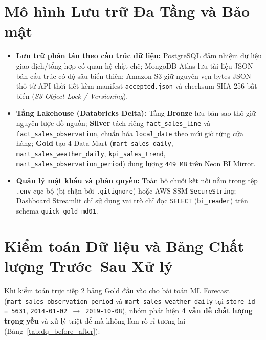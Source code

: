 \section{Mô hình Lưu trữ Đa Tầng và Bảo mật}
\begin{itemize}[leftmargin=1.5em]
  \item \textbf{Lưu trữ phân tán theo cấu trúc dữ liệu:} PostgreSQL đảm nhiệm dữ liệu giao dịch/tổng hợp có quan hệ chặt chẽ; MongoDB Atlas lưu tài liệu JSON bán cấu trúc có độ sâu biến thiên; Amazon S3 giữ nguyên vẹn bytes JSON thô từ API thời tiết kèm manifest \texttt{accepted.json} và checksum SHA-256 bất biến (\textit{S3 Object Lock / Versioning}).
  \item \textbf{Tầng Lakehouse (Databricks Delta):} Tầng \textbf{Bronze} lưu bản sao thô giữ nguyên lược đồ nguồn; \textbf{Silver} tách riêng \texttt{fact\_sales\_line} và \texttt{fact\_sales\_observation}, chuẩn hóa \texttt{local\_date} theo múi giờ từng cửa hàng; \textbf{Gold} tạo 4 Data Mart (\texttt{mart\_sales\_daily}, \texttt{mart\_sales\_weather\_daily}, \texttt{kpi\_sales\_trend}, \texttt{mart\_sales\_observation\_period}) dung lượng \texttt{449 MB} trên Neon BI Mirror.
  \item \textbf{Quản lý mật khẩu và phân quyền:} Toàn bộ chuỗi kết nối nằm trong tệp \texttt{.env} cục bộ (bị chặn bởi \texttt{.gitignore}) hoặc AWS SSM \texttt{SecureString}; Dashboard Streamlit chỉ sử dụng vai trò chỉ đọc \texttt{SELECT} (\texttt{bi\_reader}) trên schema \texttt{quick\_gold\_md01}.
\end{itemize}

\section{Kiểm toán Dữ liệu và Bảng Chất lượng Trước--Sau Xử lý}
Khi kiểm toán trực tiếp 2 bảng Gold đầu vào cho bài toán ML Forecast (\texttt{mart\_sales\_observation\_period} và \texttt{mart\_sales\_weather\_daily} tại \texttt{store\_id = 5631}, \texttt{2014-01-02 $\rightarrow$ 2019-10-08}), nhóm phát hiện \textbf{4 vấn đề chất lượng trọng yếu} và xử lý triệt để mà không làm rò rỉ tương lai (Bảng~\ref{tab:dq_before_after}):

